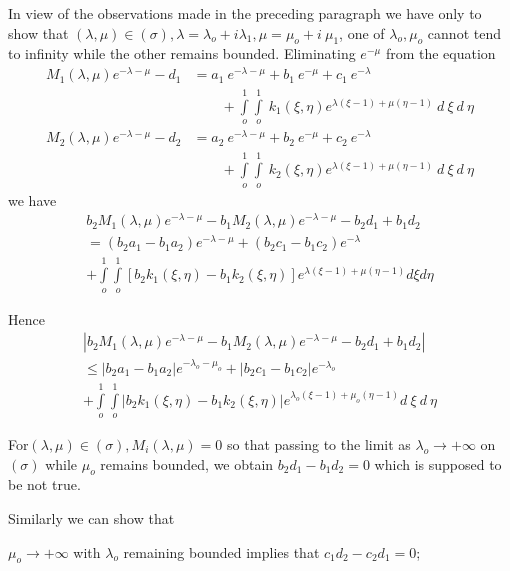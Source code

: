 In view of the observations made in the preceding paragraph we have
only to show that $(\lambda,\mu) \in (\sigma), \lambda = \lambda_o +
i \lambda_1, \mu = \mu_o + i ~\mu_1$, one of $\lambda_o, \mu_o$
cannot tend to infinity while the other remains bounded. Eliminating
$e^{-\mu}$ from the equation 
\begin{align*}
  M_1 (\lambda, \mu) e^{- \lambda - \mu} - d_1 &= a_1 ~ e^{- \lambda
    - \mu} + b_1 ~ e^{-\mu} + c_1 ~ e^{- \lambda}\\ 
  & \qquad + \int\limits_o^1
  \int\limits_o^1 ~k_1 (\xi,\eta) e^{\lambda(\xi -1) + \mu(\eta - 1)}
  ~d ~ \xi ~ d ~\eta\\ 
  M_2 (\lambda, \mu) e^{- \lambda - \mu} - d_2 &= a_2 ~ e^{- \lambda
    - \mu} + b_2 ~ e^{-\mu} + c_2 ~ e^{- \lambda}\\ 
  & \qquad + \int\limits_o^1
  \int\limits_o^1 ~k_2 (\xi,\eta) e^{\lambda(\xi -1) + \mu(\eta - 1)}
  ~d ~ \xi ~ d ~\eta 
\end{align*}
we have 
\begin{multline*}
  b_2 M_1(\lambda, \mu)e ^{-\lambda -\mu} -b_1
  M_2(\lambda,\mu)e^{-\lambda -\mu} -b_2 d_1 + b_1 d_2 \\
  = (b_2a_1-b_1a_2)e^{-\lambda-\mu} + (b_2 c_1 -b_1 c_2)
  e^{-\lambda}\\ 
  + \int\limits_o^1 \int\limits_o^1 [b_2k_1 (\xi, \eta) -b_1k_2(\xi,
    \eta)] e^{\lambda(\xi -1) + \mu (\eta -1)} d\xi d \eta 
\end{multline*}

Hence
\begin{multline*}
  | b_2 {M_1} (\lambda, \mu) e^{-\lambda -\mu } - b_1 M_2
  (\lambda,\mu)e^{- \lambda - \mu } - b_2  d_1 + b_1 d_2| \\ 
  \le | b_2 a_1 - b_1 a_2 | e^{- \lambda_o - \mu_o} + | b_2 c_1 - b_1
  c_2 | e^{-\lambda_o}\\ 
  +  \int\limits_o^1 \int\limits_o^1 | b_2 k_1
  (\xi,\eta) - b_1 k_2 (\xi,\eta) | e^{\lambda_o (\xi - 1) + \mu_o (\eta -
  1)} d ~ \xi ~ d ~ \eta 
\end{multline*}

For\pageoriginale $(\lambda, \mu) \in (\sigma), M_i (\lambda, \mu) = 0$ so that
passing to the limit as $\lambda_o \rightarrow + \infty$ on $(\sigma)$
while $\mu_o$ remains bounded, we obtain $b_2d_1 - b_1 d_2 = 0$ which
is supposed to be not true.  

Similarly we can show that

$\mu_o \to + \infty$  with $\lambda_o$  remaining
    bounded implies that  $c_1 d_2 - c_2 d_1 = 0$; 

